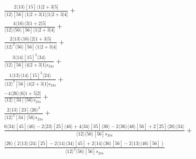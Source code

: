 \documentclass[varwidth, border=5pt]{standalone}
\begin{document}
\begin{my}
$\begin{gathered}
\scriptscriptstyle\frac{2⟨13⟩[15]⟨1|2+3|5]}{⟨12⟩[56]⟨1|2+3|1]⟨1|2+3|4]}+\\
\scriptscriptstyle\frac{4⟨16⟩⟨3|1+2|5]}{⟨12⟩⟨56⟩[56]⟨1|2+3|4]}+\\
\scriptscriptstyle\frac{2⟨13⟩⟨16⟩⟨2|1+3|5]}{⟨12⟩^2⟨56⟩[56]⟨1|2+3|4]}+\\
\scriptscriptstyle\frac{3⟨14⟩[15]^2⟨34⟩}{⟨12⟩[56]⟨4|2+3|1]s_{234}}+\\
\scriptscriptstyle\frac{1⟨13⟩⟨14⟩[15]^2⟨24⟩}{⟨12⟩^2[56]⟨4|2+3|1]s_{234}}+\\
\scriptscriptstyle\frac{-4⟨26⟩⟨6|1+5|2]}{⟨12⟩[34]⟨56⟩s_{234}}+\\
\scriptscriptstyle\frac{2⟨13⟩[23]⟨26⟩^2}{⟨12⟩^2[34]⟨56⟩s_{234}}+\\
\scriptscriptstyle\frac{6⟨34⟩[45]⟨46⟩-2⟨23⟩[25]⟨46⟩+4⟨34⟩[35]⟨36⟩-2⟨36⟩⟨46⟩[56]+2[25]⟨26⟩⟨34⟩}{⟨12⟩⟨56⟩[56]s_{234}}+\\
\scriptscriptstyle\frac{⟨26⟩(2⟨13⟩⟨24⟩[25]-2⟨14⟩⟨34⟩[45]+2⟨14⟩⟨36⟩[56]-2⟨13⟩⟨46⟩[56])}{⟨12⟩^2⟨56⟩[56]s_{234}}\phantom{+}
\end{gathered}$
\end{my}
\end{document}
